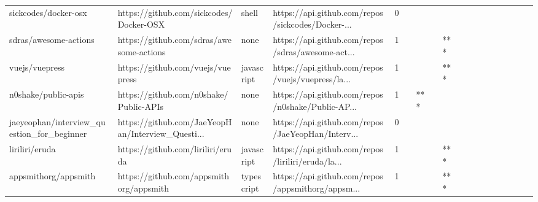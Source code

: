 \begin{tabular}{llllrlllllllllllll}
sickcodes/docker-osx                               &            https://github.com/sickcodes/Docker-OSX &             shell &  https://api.github.com/repos/sickcodes/Docker-... &       0 &         &        &           &                &                 &        &           &           &          &          &       &              &          \\
sdras/awesome-actions                              &           https://github.com/sdras/awesome-actions &              none &  https://api.github.com/repos/sdras/awesome-act... &       1 &         &        &           &            *** &                 &        &           &           &          &          &       &              &          \\
vuejs/vuepress                                     &                  https://github.com/vuejs/vuepress &        javascript &  https://api.github.com/repos/vuejs/vuepress/la... &       1 &         &        &           &            *** &                 &        &           &           &          &          &       &              &          \\
n0shake/public-apis                                &             https://github.com/n0shake/Public-APIs &              none &  https://api.github.com/repos/n0shake/Public-AP... &       1 &         &    *** &           &                &                 &        &           &           &          &          &       &              &          \\
jaeyeophan/interview\_question\_for\_beginner         &  https://github.com/JaeYeopHan/Interview\_Questi... &              none &  https://api.github.com/repos/JaeYeopHan/Interv... &       0 &         &        &           &                &                 &        &           &           &          &          &       &              &          \\
liriliri/eruda                                     &                  https://github.com/liriliri/eruda &        javascript &  https://api.github.com/repos/liriliri/eruda/la... &       1 &         &        &           &            *** &                 &        &           &           &          &          &       &              &          \\
appsmithorg/appsmith                               &            https://github.com/appsmithorg/appsmith &        typescript &  https://api.github.com/repos/appsmithorg/appsm... &       1 &         &        &           &            *** &                 &        &           &           &          &          &       &              &          \\

\end{tabular}
